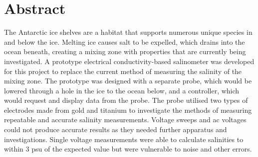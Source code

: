 \chapter*{Abstract}
The Antarctic ice shelves are a habitat that supports numerous unique species in and below the ice.
Melting ice causes salt to be expelled, which drains into the ocean beneath, creating a mixing zone with properties that are currently being investigated.
A prototype electrical conductivity-based salinometer was developed for this project to replace the current method of measuring the salinity of the mixing zone.
The prototype was designed with a separate probe, which would be lowered through a hole in the ice to the ocean below, and a controller, which would request and display data from the probe.
The probe utilised two types of electrodes made from gold and titanium to investigate the methods of measuring repeatable and accurate salinity measurements.
Voltage sweeps and \gls{ac} voltages could not produce accurate results as they needed further apparatus and investigations.
Single voltage measurements were able to calculate salinities to within $3$ \gls{psu} of the expected value but were vulnerable to noise and other errors.